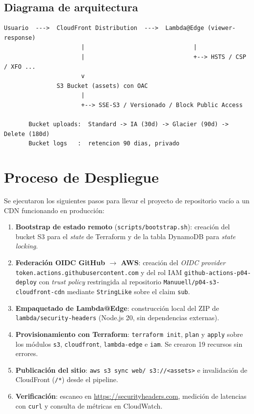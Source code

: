 \documentclass[12pt,a4paper]{report}
\begin{document}
\subsection{Diagrama de arquitectura}

\begin{verbatim}
Usuario  --->  CloudFront Distribution  --->  Lambda@Edge (viewer-response)
                      |                               |
                      |                               +--> HSTS / CSP / XFO ...
                      v
               S3 Bucket (assets) con OAC
                      |
                      +--> SSE-S3 / Versionado / Block Public Access

       Bucket uploads:  Standard -> IA (30d) -> Glacier (90d) -> Delete (180d)
       Bucket logs   :  retencion 90 dias, privado
\end{verbatim}

\section{Proceso de Despliegue}

Se ejecutaron los siguientes pasos para llevar el proyecto de repositorio vacío a un CDN funcionando en producción:

\begin{enumerate}
    \item \textbf{Bootstrap de estado remoto} (\texttt{scripts/bootstrap.sh}): creación del bucket S3 para el \textit{state} de Terraform y de la tabla DynamoDB para \textit{state locking}.
    \item \textbf{Federación OIDC GitHub $\rightarrow$ AWS}: creación del \textit{OIDC provider} \texttt{token.actions.githubusercontent.com} y del rol IAM \texttt{github-actions-p04-deploy} con \textit{trust policy} restringida al repositorio \texttt{Manuuell/p04-s3-cloudfront-cdn} mediante \texttt{StringLike} sobre el claim \texttt{sub}.
    \item \textbf{Empaquetado de Lambda@Edge}: construcción local del ZIP de \texttt{lambda/security-headers} (Node.js 20, sin dependencias externas).
    \item \textbf{Provisionamiento con Terraform}: \texttt{terraform init}, \texttt{plan} y \texttt{apply} sobre los módulos \texttt{s3}, \texttt{cloudfront}, \texttt{lambda-edge} e \texttt{iam}. Se crearon 19 recursos sin errores.
    \item \textbf{Publicación del sitio}: \texttt{aws s3 sync web/ s3://<assets>} e invalidación de CloudFront (\texttt{/*}) desde el pipeline.
    \item \textbf{Verificación}: escaneo en \url{https://securityheaders.com}, medición de latencias con \texttt{curl} y consulta de métricas en CloudWatch.
\end{enumerate}
\end{document}
